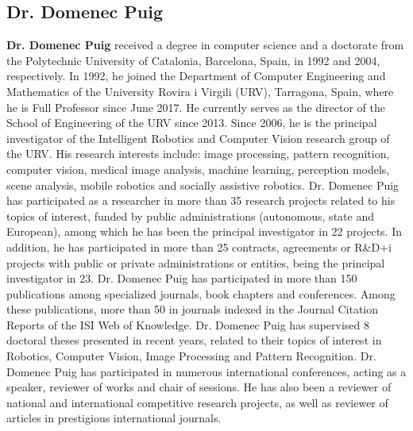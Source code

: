 \documentclass{elsarticle}
\begin{document}
\subsection*{Dr. Domenec Puig}
\textbf{Dr. Domenec Puig} received a degree in computer science and a doctorate from the Polytechnic University of Catalonia, Barcelona, ​​Spain, in 1992 and 2004, respectively. In 1992, he joined the Department of Computer Engineering and Mathematics of the University Rovira i Virgili (URV), Tarragona, Spain, where he is Full Professor since June 2017. He currently serves as the director of the School of Engineering of the URV since 2013. Since 2006, he is the principal investigator of the Intelligent Robotics and Computer Vision research group of the URV. His research interests include: image processing, pattern recognition, computer vision, medical image analysis, machine learning, perception models, scene analysis, mobile robotics and socially assistive robotics. Dr. Domenec Puig has participated as a researcher in more than 35 research projects related to his topics of interest, funded by public administrations (autonomous, state and European), among which he has been the principal investigator in 22 projects. In addition, he has participated in more than 25 contracts, agreements or R\&D+i projects with public or private administrations or entities, being the principal investigator in 23. Dr. Domenec Puig has participated in more than 150 publications among specialized journals, book chapters and conferences. Among these publications, more than 50 in journals indexed in the Journal Citation Reports of the ISI Web of Knowledge. Dr. Domenec Puig has supervised 8 doctoral theses presented in recent years, related to their topics of interest in Robotics, Computer Vision, Image Processing and Pattern Recognition. Dr. Domenec Puig has participated in numerous international conferences, acting as a speaker, reviewer of works and chair of sessions. He has also been a reviewer of national and international competitive research projects, as well as reviewer of articles in prestigious international journals.
\end{document}
